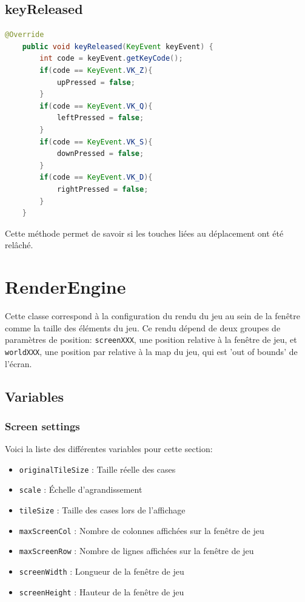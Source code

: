 \documentclass[11pt,a4paper,french]{article}
\begin{document}
\subsection{keyReleased}
\begin{lstlisting}[language=Java]
    @Override
    public void keyReleased(KeyEvent keyEvent) {
        int code = keyEvent.getKeyCode();
        if(code == KeyEvent.VK_Z){
            upPressed = false;
        }
        if(code == KeyEvent.VK_Q){
            leftPressed = false;
        }
        if(code == KeyEvent.VK_S){
            downPressed = false;
        }
        if(code == KeyEvent.VK_D){
            rightPressed = false;
        }
    }
\end{lstlisting}
Cette méthode permet de savoir si les touches liées au déplacement ont été relâché.

\section{RenderEngine}

Cette classe correspond à la configuration du rendu du jeu au sein de la fenêtre comme la taille des éléments du jeu.
Ce rendu dépend de deux groupes de paramètres de position: \verb|screenXXX|, une position relative à la fenêtre de jeu, et 
\verb|worldXXX|, une position par relative à la map du jeu, qui est 'out of bounds' de l'écran.
\subsection{Variables}

\subsubsection{Screen settings}
Voici la liste des différentes variables pour cette section:
\begin{itemize}
    \item \verb|originalTileSize| : Taille réelle des cases
    \item \verb|scale| : Échelle d'agrandissement
    \item \verb|tileSize| : Taille des cases lors de l'affichage
    \item \verb|maxScreenCol| : Nombre de colonnes affichées sur la fenêtre de jeu
    \item \verb|maxScreenRow| : Nombre de lignes affichées sur la fenêtre de jeu
    \item \verb|screenWidth| : Longueur de la fenêtre de jeu
    \item \verb|screenHeight| : Hauteur de la fenêtre de jeu
\end{itemize}
\end{document}
